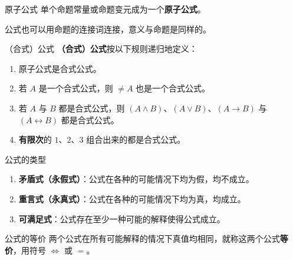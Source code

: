 
\begin{definition}{原子公式}
单个命题常量或命题变元成为一个\textbf{原子公式}。
\end{definition}

公式也可以用命题的连接词连接，意义与命题是同样的。


\begin{definition}{（合式）公式}
\textbf{（合式）公式}按以下规则递归地定义：
\begin{enumerate}
\item 原子公式是合式公式。
\item 若 $A$ 是一个合式公式，则 $\neq A$ 也是一个合式公式。
\item 若 $A$ 与 $B$ 都是合式公式，则 $(A \land B)$、$(A \lor B)$、$(A \to B)$ 与 $(A \leftrightarrow B)$ 都是合式公式。
\item \textbf{有限次}的 $1$、$2$、$3$ 组合出来的都是合式公式。
\end{enumerate}

\end{definition}
\begin{definition}{公式的类型}
\begin{enumerate}
\item \textbf{矛盾式（永假式）}：公式在各种的可能情况下均为假，均不成立。
\item \textbf{重言式（永真式）}：公式在各种的可能情况下均为真，均成立。
\item \textbf{可满足式}：公式存在至少一种可能的解释使得公式成立。
\end{enumerate}
\end{definition}

\begin{definition}{公式的等价}
两个公式在所有可能解释的情况下真值均相同，就称这两个公式\textbf{等价}，用符号 $\Leftrightarrow$ 或 $=$。
\end{definition}

